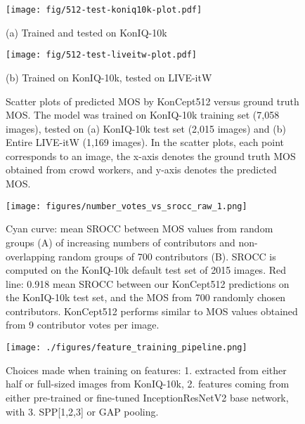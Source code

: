 \documentclass[10pt,journal,compsoc]{IEEEtran}
\begin{document}
\begin{figure*}[!ht]
\centering
\begin{minipage}{0.4\linewidth}
\centerline{\texttt{[image: fig/512-test-koniq10k-plot.pdf]}}
\centerline{(a) Trained and tested on KonIQ-10k}
\end{minipage}
\begin{minipage}{0.4\linewidth}
\centerline{\texttt{[image: fig/512-test-liveitw-plot.pdf]}}
\centerline{(b) Trained on KonIQ-10k, tested on LIVE-itW}
\end{minipage}
\caption{Scatter plots of predicted MOS by KonCept512 versus ground truth MOS. The model was trained on KonIQ-10k training set (7,058 images), tested on (a) KonIQ-10k test set (2,015 images) and (b) Entire LIVE-itW (1,169 images). In the scatter plots, each point corresponds to an image, the x-axis denotes the ground truth MOS obtained from crowd workers, and y-axis denotes the predicted MOS.
}
\label{fig:512-test-plot}
\end{figure*}











\begin{figure}[!t]
\centering
\vspace{-0pt}
\texttt{[image: figures/number\_votes\_vs\_srocc\_raw\_1.png]}
\caption{Cyan curve: mean SROCC between MOS values from random groups (A) of increasing numbers of contributors and non-overlapping random groups of 700 contributors (B). SROCC is computed on the KonIQ-10k default test set of 2015 images. Red line: 0.918 mean SROCC between our KonCept512 predictions on the KonIQ-10k test set, and the MOS from 700 randomly chosen contributors. KonCept512 performs similar to MOS values obtained from 9 contributor votes per image.}
\label{fig:group-agreement-2}
\end{figure}

\begin{figure*}[!t]
\centering
\texttt{[image: ./figures/feature\_training\_pipeline.png]}
\caption{Choices made when training on features: 1. extracted from either half or full-sized images from KonIQ-10k, 2. features coming from either pre-trained or fine-tuned InceptionResNetV2 base network, with 3. SPP[1,2,3] or GAP pooling.}
\label{fig:feature-learning}
\end{figure*}
\end{document}
